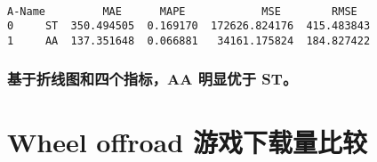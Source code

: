 \documentclass[11pt]{article}
\begin{document}
    \begin{center}
    \end{center}
    { \hspace*{\fill} \\}
    
    \begin{Verbatim}[commandchars=\\\{\}]
  A-Name         MAE      MAPE            MSE        RMSE
0     ST  350.494505  0.169170  172626.824176  415.483843
1     AA  137.351648  0.066881   34161.175824  184.827422

    \end{Verbatim}

    \subsubsection{基于折线图和四个指标，AA 明显优于
ST。}\label{ux57faux4e8eux6298ux7ebfux56feux548cux56dbux4e2aux6307ux6807aa-ux660eux663eux4f18ux4e8e-st}

    \section{Wheel offroad
游戏下载量比较}\label{wheel-offroad-ux6e38ux620fux4e0bux8f7dux91cfux6bd4ux8f83}
\end{document}
